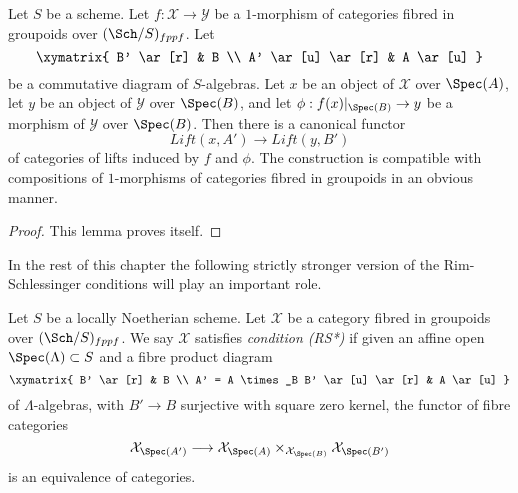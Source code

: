 \begin{lemma}
\label{lemma-functoriality}
Let $S$ be a scheme. Let $f : \mathcal{X} \to \mathcal{Y}$ be a $1$-morphism
of categories fibred in groupoids over $(\Sch/S)_{fppf}$. Let
$$
\xymatrix{
B' \ar[r] & B \\
A' \ar[u] \ar[r] & A \ar[u]
}
$$
be a commutative diagram of $S$-algebras. Let $x$ be an object of $\mathcal{X}$
over $\Spec(A)$, let $y$ be an object of $\mathcal{Y}$ over $\Spec(B)$,
and let $\phi : f(x)|_{\Spec(B)} \to y$ be a morphism of $\mathcal{Y}$
over $\Spec(B)$. Then there is a canonical functor
$$
\textit{Lift}(x, A') \longrightarrow \textit{Lift}(y, B')
$$
of categories of lifts induced by $f$ and $\phi$. The construction is
compatible with compositions of $1$-morphisms of categories fibred in
groupoids in an obvious manner.
\end{lemma}

\begin{proof}
This lemma proves itself.
\end{proof}

\noindent
In the rest of this chapter the following strictly stronger version
of the Rim-Schlessinger conditions will play an important role.

\begin{definition}
\label{definition-RS-star}
Let $S$ be a locally Noetherian scheme. Let $\mathcal{X}$ be a category
fibred in groupoids over $(\Sch/S)_{fppf}$. We say $\mathcal{X}$
satisfies {\it condition (RS*)} if given an affine open
$\Spec(\Lambda) \subset S$ and a fibre product diagram
$$
\xymatrix{
B' \ar[r] & B \\
A' = A \times_B B' \ar[u] \ar[r] & A \ar[u]
}
$$
of $\Lambda$-algebras, with $B' \to B$ surjective with square zero kernel,
the functor of fibre categories
$$
\mathcal{X}_{\Spec(A')}
\longrightarrow
\mathcal{X}_{\Spec(A)} \times_{\mathcal{X}_{\Spec(B)}} \mathcal{X}_{\Spec(B')}
$$
is an equivalence of categories.
\end{definition}

